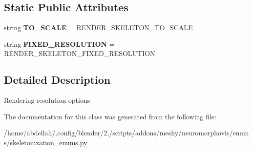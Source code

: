 \subsection*{Static Public Attributes}
\begin{DoxyCompactItemize}
\item 
string {\bfseries T\+O\+\_\+\+S\+C\+A\+LE} = \textquotesingle{}R\+E\+N\+D\+E\+R\+\_\+\+S\+K\+E\+L\+E\+T\+O\+N\+\_\+\+T\+O\+\_\+\+S\+C\+A\+LE\textquotesingle{}\hypertarget{classmeshy_1_1neuromorphovis_1_1enums_1_1skeletonization__enums_1_1Skeletonization_1_1Rendering_1_1Resolution_a2f92b9e419e1c3da5a9b8f328e14d110}{}\label{classmeshy_1_1neuromorphovis_1_1enums_1_1skeletonization__enums_1_1Skeletonization_1_1Rendering_1_1Resolution_a2f92b9e419e1c3da5a9b8f328e14d110}

\item 
string {\bfseries F\+I\+X\+E\+D\+\_\+\+R\+E\+S\+O\+L\+U\+T\+I\+ON} = \textquotesingle{}R\+E\+N\+D\+E\+R\+\_\+\+S\+K\+E\+L\+E\+T\+O\+N\+\_\+\+F\+I\+X\+E\+D\+\_\+\+R\+E\+S\+O\+L\+U\+T\+I\+ON\textquotesingle{}\hypertarget{classmeshy_1_1neuromorphovis_1_1enums_1_1skeletonization__enums_1_1Skeletonization_1_1Rendering_1_1Resolution_a17ba4976c8edce6abefb9bb3baeb133f}{}\label{classmeshy_1_1neuromorphovis_1_1enums_1_1skeletonization__enums_1_1Skeletonization_1_1Rendering_1_1Resolution_a17ba4976c8edce6abefb9bb3baeb133f}

\end{DoxyCompactItemize}


\subsection{Detailed Description}


\begin{DoxyVerb}Rendering resolution options
\end{DoxyVerb}
 

The documentation for this class was generated from the following file\+:\begin{DoxyCompactItemize}
\item 
/home/abdellah/.\+config/blender/2./scripts/addons/meshy/neuromorphovis/enums/skeletonization\+\_\+enums.\+py\end{DoxyCompactItemize}
